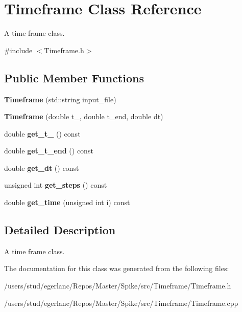 \hypertarget{classTimeframe}{}\section{Timeframe Class Reference}
\label{classTimeframe}


A time frame class.  




{\ttfamily \#include $<$Timeframe.\+h$>$}

\subsection*{Public Member Functions}
\begin{DoxyCompactItemize}
\item 
\mbox{\label{classTimeframe_a2d1eb1561d24878e9bc13fd87ea8ca8b}} 
{\bfseries Timeframe} (std\+::string input\+\_\+file)
\item 
\mbox{\label{classTimeframe_af5d584ab6f4c4c3849dbd5c80d73295d}} 
{\bfseries Timeframe} (double t\+\_, double t\+\_\+end, double dt)
\item 
\mbox{\label{classTimeframe_ac4d68f0dda6236bf00f644fec9b76610}} 
double {\bfseries get\+\_\+t\+\_} () const
\item 
\mbox{\label{classTimeframe_a4279074ba6bcf79e10d1c70a2e0b6a7a}} 
double {\bfseries get\+\_\+t\+\_\+end} () const
\item 
\mbox{\label{classTimeframe_ac64d137f989d2cdf83ac693a6181ae36}} 
double {\bfseries get\+\_\+dt} () const
\item 
\mbox{\label{classTimeframe_ab949d563c53cc2354476e8cf922ce71c}} 
unsigned int {\bfseries get\+\_\+steps} () const
\item 
\mbox{\label{classTimeframe_a1185ae758148b9f32ee945ec87b95dd5}} 
double {\bfseries get\+\_\+time} (unsigned int i) const
\end{DoxyCompactItemize}


\subsection{Detailed Description}
A time frame class. 

The documentation for this class was generated from the following files\+:\begin{DoxyCompactItemize}
\item 
/users/stud/egerlanc/\+Repos/\+Master/\+Spike/src/\+Timeframe/Timeframe.\+h\item 
/users/stud/egerlanc/\+Repos/\+Master/\+Spike/src/\+Timeframe/Timeframe.\+cpp\end{DoxyCompactItemize}
